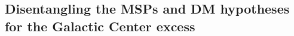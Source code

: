 \documentclass[doublespace,nopageskip]{VTthesis}
\begin{document}



\subsection{Disentangling the MSPs and DM hypotheses for the Galactic Center excess}
\label{subsec:disentanglingMSPsfromDM}
\end{document}
